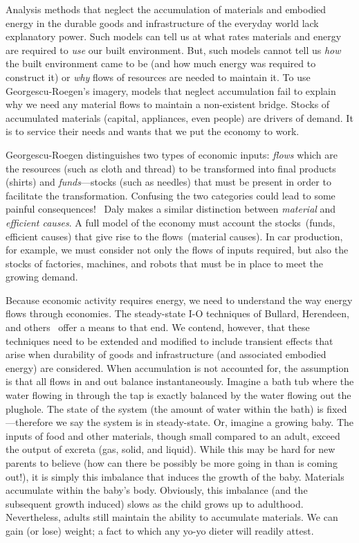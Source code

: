 Analysis methods that neglect the accumulation 
of materials
and embodied energy
in the durable goods and infrastructure 
of the everyday world lack explanatory power. 
Such models can tell us at what rates materials 
and energy are required 
to \emph{use} our built environment. 
But, such models cannot tell us \emph{how} 
the built environment came to be 
(and how much energy was required to construct it) 
or \emph{why} flows of resources are needed to maintain it. 
To use Georgescu-Roegen's imagery, 
models that neglect accumulation
fail to explain 
why we need any material flows to maintain a non-existent bridge. 
Stocks of accumulated materials 
(capital, appliances, even people) 
are drivers of demand. 
It is to service their needs and wants that we put the economy to work. 

Georgescu-Roegen distinguishes two types of economic
inputs: \emph{flows} which are the resources (such as cloth and thread)
to be transformed into final products (shirts) 
and \emph{funds}---stocks
(such as needles) that must be present in order to facilitate the transformation.
Confusing the two categories could lead to some painful 
consequences!~\cite{G-R1970}
Daly makes a similar distinction between \emph{material} 
and \emph{efficient causes}.\cite{Daly2006}
A full model of the economy must account the 
stocks~(funds, efficient causes) that give rise
to the flows~(material causes). In car production, for example,
we must consider
not only the flows of inputs required, but also the stocks
of factories, machines, and robots that must be in place
to meet the growing demand.

Because economic activity requires energy, 
we need to understand the way energy flows through economies. 
The steady-state I-O techniques of Bullard, Herendeen, 
and others~\cite{Bullard1975,Herendeen1978} 
offer a means to that end. 
We contend, however, that these techniques 
need to be extended and modified 
to include transient effects 
that arise when durability of goods and infrastructure 
(and associated embodied energy) are considered. 
When accumulation is not accounted for,
the assumption is that all flows in and out balance
instantaneously.
Imagine a bath tub where the water flowing in
through the tap is exactly balanced by the water
flowing out the plughole.
The state of the system 
(the amount of water within the bath) is 
fixed---therefore we say the system is in
steady-state.
Or, imagine a growing baby.
The inputs of food and other materials,
though small compared to an adult,
exceed the output of excreta
(gas, solid, and liquid).
While this may be hard for new parents to believe
(how can there be possibly be more going in than is coming out!),
it is simply this imbalance that induces the growth of the baby.
Materials accumulate within the baby's body.
Obviously, 
this imbalance (and the subsequent growth induced)
slows as the child grows up to adulthood.
Nevertheless,
adults still maintain the ability to accumulate
materials.
We can gain (or lose) weight;
a fact to which any yo-yo dieter will readily attest.

